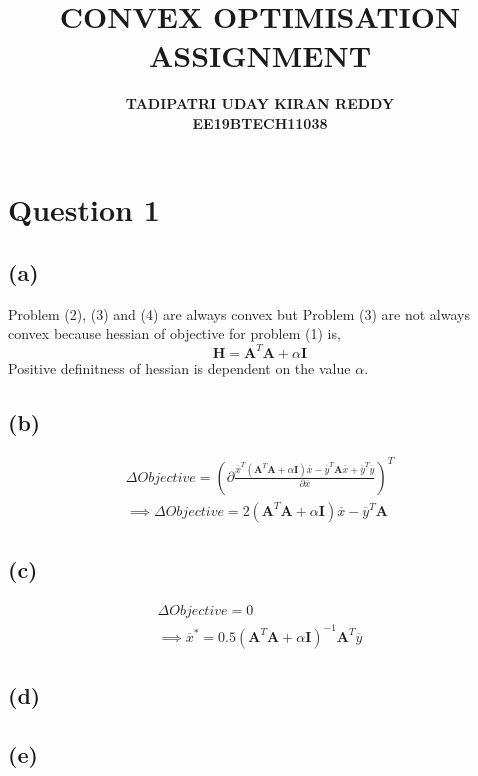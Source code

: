 \documentclass{article}
\begin{document}
\title{\textbf{CONVEX OPTIMISATION}\\{\textbf{ASSIGNMENT }}}
\author{\textbf{TADIPATRI UDAY KIRAN REDDY}\\\textbf{EE19BTECH11038}}
\maketitle

\section*{\hfil Question 1}
\subsection*{(a)}
Problem (2), (3) and (4) are always convex but Problem (3) are not always convex because hessian of objective for problem (1) is,
\begin{equation*}
	\mathbf{H} = \mathbf{A}^T\mathbf{A} + \alpha\mathbf{I}	
\end{equation*}
Positive definitness of hessian is dependent on the value $\alpha$.
\subsection*{(b)}
\begin{gather*}
	\Delta Objective = \left(\partial \frac{\overline{x}^T(\mathbf{A}^T\mathbf{A}+\alpha \mathbf{I})\overline{x} - \overline{y}^T\mathbf{A}\overline{x} + \overline{y}^T\overline{y}}{\partial \overline{x}}\right)^T\\
	\implies \Delta Objective = 2(\mathbf{A}^T\mathbf{A}+\alpha \mathbf{I})\overline{x} - \overline{y}^T\mathbf{A}
\end{gather*}
\subsection*{(c)}
\begin{gather*}
	\Delta Objective = 0\\
	\implies \overline{x}^* = 0.5(\mathbf{A}^T\mathbf{A}+\alpha \mathbf{I})^{-1}\mathbf{A}^T\overline{y}
\end{gather*}
\subsection*{(d)}
\subsection*{(e)}
\end{document}
